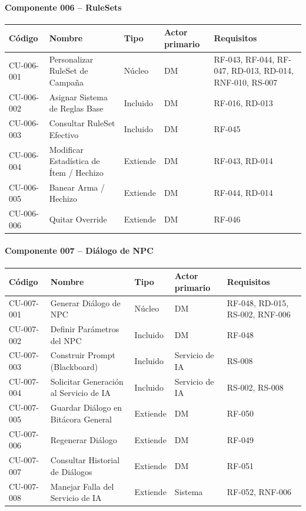 \paragraph{Componente 006 -- RuleSets}
{\footnotesize\setlength{\tabcolsep}{4pt}\renewcommand{\arraystretch}{1.15}
\begin{longtable}{|>{\raggedright\arraybackslash}p{1.9cm}|>{\raggedright\arraybackslash}p{4.4cm}|>{\raggedright\arraybackslash}p{1.7cm}|>{\raggedright\arraybackslash}p{2.5cm}|>{\raggedright\arraybackslash}p{4.0cm}|}
\hline
\textbf{Código} & \textbf{Nombre} & \textbf{Tipo} & \textbf{Actor primario} & \textbf{Requisitos} \\ \hline\endhead
CU-006-001 & Personalizar RuleSet de Campaña & Núcleo & DM & RF-043, RF-044, RF-047, RD-013, RD-014, RNF-010, RS-007 \\ \hline
CU-006-002 & Asignar Sistema de Reglas Base & Incluido & DM & RF-016, RD-013 \\ \hline
CU-006-003 & Consultar RuleSet Efectivo & Incluido & DM & RF-045 \\ \hline
CU-006-004 & Modificar Estadística de Ítem / Hechizo & Extiende & DM & RF-043, RD-014 \\ \hline
CU-006-005 & Banear Arma / Hechizo & Extiende & DM & RF-044, RD-014 \\ \hline
CU-006-006 & Quitar Override & Extiende & DM & RF-046 \\ \hline
\end{longtable}}
\paragraph{Componente 007 -- Diálogo de NPC}
{\footnotesize\setlength{\tabcolsep}{4pt}\renewcommand{\arraystretch}{1.15}
\begin{longtable}{|>{\raggedright\arraybackslash}p{1.9cm}|>{\raggedright\arraybackslash}p{4.4cm}|>{\raggedright\arraybackslash}p{1.7cm}|>{\raggedright\arraybackslash}p{2.5cm}|>{\raggedright\arraybackslash}p{4.0cm}|}
\hline
\textbf{Código} & \textbf{Nombre} & \textbf{Tipo} & \textbf{Actor primario} & \textbf{Requisitos} \\ \hline\endhead
CU-007-001 & Generar Diálogo de NPC & Núcleo & DM & RF-048, RD-015, RS-002, RNF-006 \\ \hline
CU-007-002 & Definir Parámetros del NPC & Incluido & DM & RF-048 \\ \hline
CU-007-003 & Construir Prompt (Blackboard) & Incluido & Servicio de IA & RS-008 \\ \hline
CU-007-004 & Solicitar Generación al Servicio de IA & Incluido & Servicio de IA & RS-002, RS-008 \\ \hline
CU-007-005 & Guardar Diálogo en Bitácora General & Extiende & DM & RF-050 \\ \hline
CU-007-006 & Regenerar Diálogo & Extiende & DM & RF-049 \\ \hline
CU-007-007 & Consultar Historial de Diálogos & Extiende & DM & RF-051 \\ \hline
CU-007-008 & Manejar Falla del Servicio de IA & Extiende & Sistema & RF-052, RNF-006 \\ \hline
\end{longtable}}

